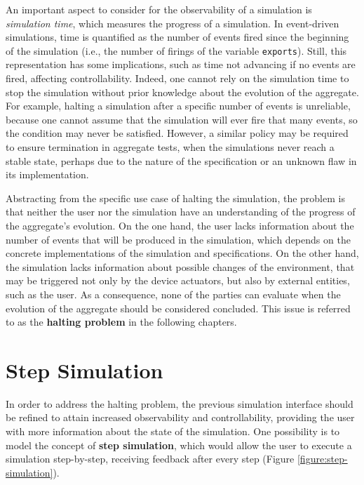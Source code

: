 An important aspect to consider for the observability of a simulation is
\textit{simulation time}, which measures the progress of a simulation. In
event-driven simulations, time is quantified as the number of events fired
since the beginning of the simulation (i.e., the number of firings of the
variable \texttt{exports}). Still, this representation has some implications,
such as time not advancing if no events are fired, affecting controllability.
Indeed, one cannot rely on the simulation time to stop the simulation without
prior knowledge about the evolution of the aggregate. For example, halting a
simulation after a specific number of events is unreliable, because one cannot
assume that the simulation will ever fire that many events, so the condition
may never be satisfied. However, a similar policy may be required to ensure
termination in aggregate tests, when the simulations never reach a stable
state, perhaps due to the nature of the specification or an unknown flaw in its
implementation.

Abstracting from the specific use case of halting the simulation, the problem
is that neither the user nor the simulation have an understanding of the
progress of the aggregate's evolution. On the one hand, the user lacks
information about the number of events that will be produced in the simulation,
which depends on the concrete implementations of the simulation and
specifications. On the other hand, the simulation lacks information about
possible changes of the environment, that may be triggered not only by the
device actuators, but also by external entities, such as the user. As a
consequence, none of the parties can evaluate when the evolution of the
aggregate should be considered concluded. This issue is referred to as the
\textbf{halting problem} in the following chapters.

\section{Step Simulation}
\label{section:design:step-simulation}

In order to address the halting problem, the previous simulation interface
should be refined to attain increased observability and controllability,
providing the user with more information about the state of the simulation. One
possibility is to model the concept of \textbf{step simulation}, which would
allow the user to execute a simulation step-by-step, receiving feedback after
every step (Figure \ref{figure:step-simulation}).

